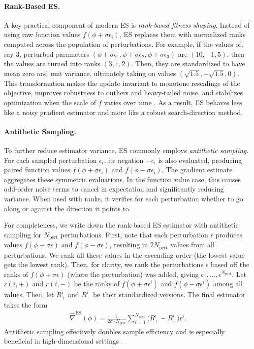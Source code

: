 \documentclass{article}
\theoremstyle{plain}
\theoremstyle{definition}
\theoremstyle{remark}
\begin{document}
\paragraph{Rank-Based ES.} A key practical component of modern ES is \emph{rank-based fitness shaping}. Instead of using raw function values $f(\phi + \sigma \epsilon_i)$, ES replaces them with normalized ranks computed across the population of perturbations. 
For example, if the values of, say 3, perturbed parameters $(\phi + \sigma \epsilon_1, \phi + \sigma \epsilon_2, \phi + \sigma \epsilon_3)$  are $(10, -1, 5)$,
then the values are turned into ranks $(3, 1, 2)$.
Then, they are standardized to have mean zero and unit variance, ultimately taking on values $(\sqrt{1.5}, -\sqrt{1.5}, 0)$.
This transformation makes the update invariant to monotone rescalings of the objective, improves robustness to outliers and heavy-tailed noise, and stabilizes optimization when the scale of $f$ varies over time \citep{salimans2017evolution, wierstra2014natural}. As a result, ES behaves less like a noisy gradient estimator and more like a robust search-direction method.

\paragraph{Antithetic Sampling.} To further reduce estimator variance, ES commonly employs \emph{antithetic sampling}. For each sampled perturbation $\epsilon_i$, its negation $-\epsilon_i$ is also evaluated, producing paired function values $f(\phi + \sigma \epsilon_i)$ and $f(\phi - \sigma \epsilon_i)$. The gradient estimate aggregates these symmetric evaluations.
In the function value case, this causes odd-order noise terms to cancel in expectation and significantly reducing variance. 
When used with ranks, it verifies for each perturbation whether to go along or against the direction it points to.

For completeness, we write down the rank-based ES estimator with antithetic sampling for $N_{\text{pert}}$ perturbations.
First, note that each perturbation $\epsilon$ produces values $f(\phi + \sigma \epsilon)$ and $f(\phi - \sigma \epsilon)$, resulting in $2N_{\text{pert}}$ values from all perturbations.
We rank all these values in the ascending order (the lowest value gets the lowest rank). 
Then, for clarity, we rank the perturbations $\epsilon$ based off the ranks of $f(\phi + \sigma \epsilon)$ (where the perturbation) was added, giving $\epsilon^1, \dots, \epsilon^{N_{\text{pert}}}$.
Let $r(i, +)$ and $r(i, -)$ be the ranks of $f(\phi + \sigma \epsilon^i)$ and $f(\phi - \sigma \epsilon^i)$ among all values.
Then, let $R^{i}_{+}$ and $R^{i}_{-}$ be their standardized versions.
The final estimator takes the form
\begin{align}
    \label{eq:es-anti}
    \hat{\nabla}^{\text{ES}}(\phi) = \frac{1}{2\sigma \cdot N_{\text{pert}}}\sum_{i=1}^{N_{\text{pert}}}\big(R^{i}_{+} - R^{i}_{-}\big)\epsilon^i.
\end{align}
Antithetic sampling effectively doubles sample efficiency and is especially beneficial in high-dimensional settings \citep{salimans2017evolution, glasserman2004monte}.
\end{document}
